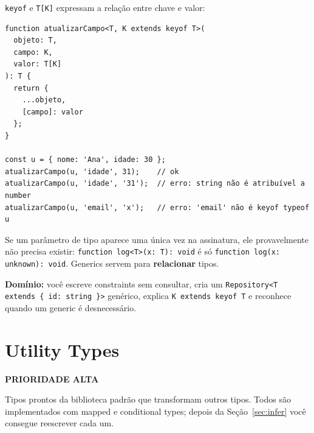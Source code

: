 \documentclass[12pt,a4paper,oneside]{book}
\newcommand{\alta}{\colorbox{red!15}{\sffamily\scriptsize\bfseries PRIORIDADE ALTA}}
\newcommand{\code}[1]{\texttt{#1}}
\newcommand{\dom}[1]{\begin{dominio}\textbf{Domínio:} #1\end{dominio}}
\begin{document}
\code{keyof} e \code{T[K]} expressam a relação entre chave e valor:

\begin{verbatim}
function atualizarCampo<T, K extends keyof T>(
  objeto: T,
  campo: K,
  valor: T[K]
): T {
  return {
    ...objeto,
    [campo]: valor
  };
}

const u = { nome: 'Ana', idade: 30 };
atualizarCampo(u, 'idade', 31);    // ok
atualizarCampo(u, 'idade', '31');  // erro: string não é atribuível a number
atualizarCampo(u, 'email', 'x');   // erro: 'email' não é keyof typeof u
\end{verbatim}

\begin{nota}[Heurística]
Se um parâmetro de tipo aparece uma única vez na assinatura, ele provavelmente não precisa existir: \code{function log<T>(x: T): void} é só \code{function log(x: unknown): void}. Generics servem para \textbf{relacionar} tipos.
\end{nota}

\dom{você escreve constraints sem consultar, cria um \code{Repository<T extends \{ id: string \}>} genérico, explica \code{K extends keyof T} e reconhece quando um generic é desnecessário.}

\section{Utility Types}
\label{sec:utility}
\alta

Tipos prontos da biblioteca padrão que transformam outros tipos. Todos são implementados com mapped e conditional types; depois da Seção~\ref{sec:infer} você consegue reescrever cada um.
\end{document}

